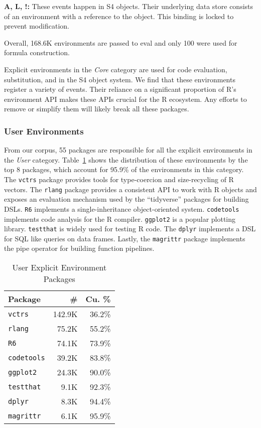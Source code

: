 \documentclass[10pt,review,sigplan,authorversion=true]{acmart}
\newcommand{\code}[1]{\lstinline |#1|\xspace}
\begin{document}
\noindent
\textbf{A, L, !:} These events happen in S4 objects. Their underlying data store
consists of an environment with a reference to the object. This binding is
locked to prevent modification.

Overall, 168.6K environments are passed to eval and only 100 were used for
formula construction.

Explicit environments in the \emph{Core} category are used for code evaluation,
substitution, and in the S4 object system. We find that these environments
register a variety of events. Their reliance on a significant proportion of R's
environment API makes these APIs crucial for the R ecosystem. Any efforts to
remove or simplify them will likely break all these packages.

\subsubsection{User Environments}

From our corpus, 55 packages are responsible for all the explicit environments
in the \emph{User} category. Table~\ref{table:user_explicit_pack} shows the
distribution of these environments by the top 8 packages, which account for
95.9\% of the environments in this category. The \code{vctrs} package provides
tools for type-coercion and size-recycling of R vectors. The \code{rlang}
package provides a consistent API to work with R objects and exposes an
evaluation mechanism used by the ``tidyverse'' packages for building DSLs.
\code{R6} implements a single-inheritance object-oriented system.
\code{codetools} implements code analysis for the R compiler. \code{ggplot2} is
a popular plotting library. \code{testthat} is widely used for testing R code.
The \code{dplyr} implements a DSL for SQL like queries on data frames.
Lastly, the \code{magrittr} package implements the pipe operator for building
function pipelines.

\begin{table}[!h]
  \small
  \caption{User Explicit Environment Packages} \label{table:user_explicit_pack}
  \centering
  \begin{tabular}{lrr}
    \toprule
    \textbf{Package}&\textbf{\#}&\textbf{Cu. \%}\\
    \midrule
    \code{vctrs}&142.9K&36.2\%\\
    \code{rlang}&75.2K&55.2\%\\
    \code{R6}&74.1K&73.9\%\\
    \code{codetools}&39.2K&83.8\%\\
    \code{ggplot2}&24.3K&90.0\%\\
    \code{testthat}&9.1K&92.3\%\\
    \code{dplyr}&8.3K&94.4\%\\
    \code{magrittr}&6.1K&95.9\%\\
    \bottomrule
  \end{tabular}
\end{table}
\end{document}
